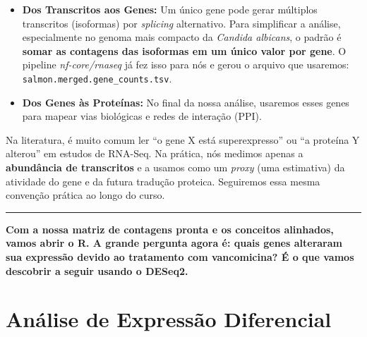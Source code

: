 \documentclass[
  letterpaper,
  DIV=11,
  numbers=noendperiod]{scrreprt}
\providecommand{\tightlist}{%
  \setlength{\itemsep}{0pt}\setlength{\parskip}{0pt}}
\begin{document}
\begin{itemize}
\tightlist
\item
  \textbf{Dos Transcritos aos Genes:} Um único gene pode gerar múltiplos
  transcritos (isoformas) por \emph{splicing} alternativo. Para
  simplificar a análise, especialmente no genoma mais compacto da
  \emph{Candida albicans}, o padrão é \textbf{somar as contagens das
  isoformas em um único valor por gene}. O pipeline
  \emph{nf-core/rnaseq} já fez isso para nós e gerou o arquivo que
  usaremos: \texttt{salmon.merged.gene\_counts.tsv}.
\item
  \textbf{Dos Genes às Proteínas:} No final da nossa análise, usaremos
  esses genes para mapear vias biológicas e redes de interação (PPI).
\end{itemize}

\begin{tcolorbox}[enhanced jigsaw, arc=.35mm, bottomrule=.15mm, bottomtitle=1mm, breakable, colback=white, colbacktitle=quarto-callout-note-color!10!white, colframe=quarto-callout-note-color-frame, coltitle=black, left=2mm, leftrule=.75mm, opacityback=0, opacitybacktitle=0.6, rightrule=.15mm, title=\textcolor{quarto-callout-note-color}{\faInfo}\hspace{0.5em}{Atenção aos Termos}, titlerule=0mm, toprule=.15mm, toptitle=1mm]

Na literatura, é muito comum ler ``o gene X está superexpresso'' ou ``a
proteína Y alterou'' em estudos de RNA-Seq. Na prática, nós medimos
apenas a \textbf{abundância de transcritos} e a usamos como um
\emph{proxy} (uma estimativa) da atividade do gene e da futura tradução
proteica. Seguiremos essa mesma convenção prática ao longo do curso.

\end{tcolorbox}

\begin{center}\rule{0.5\linewidth}{0.5pt}\end{center}

\textbf{Com a nossa matriz de contagens pronta e os conceitos alinhados,
vamos abrir o R. A grande pergunta agora é: quais genes alteraram sua
expressão devido ao tratamento com vancomicina? É o que vamos descobrir
a seguir usando o DESeq2.}


\chapter{Análise de Expressão
Diferencial}\label{anuxe1lise-de-expressuxe3o-diferencial}
\end{document}
